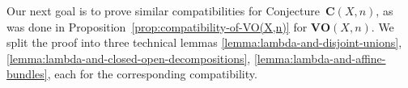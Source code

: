 \documentclass[10pt,a4paper,oneside,draft]{article}
\DeclareMathOperator{\Hom}{Hom}
\DeclareMathOperator{\ord}{ord}
\DeclareMathOperator{\rk}{rk}
\newcommand{\CC}{\mathbb{C}}
\newcommand{\RR}{\mathbb{R}}
\newcommand{\ZZ}{\mathbb{Z}}
\newcommand{\et}{\text{\it \'{e}t}}
\newcommand{\Wc}{\text{\it W,c}}
\newcommand{\dfn}{\mathrel{\mathop:}=}
\newcommand{\RHom}{R\!\Hom}
\theoremstyle{myplain}
\theoremstyle{mydefinition}
\newtheorem{remark}[theorem]{Remark}
\numberwithin{equation}{section}
\begin{document}


Our next goal is to prove similar compatibilities for
Conjecture~$\mathbf{C} (X,n)$, as was done in
Proposition~\ref{prop:compatibility-of-VO(X,n)} for $\mathbf{VO} (X,n)$.
We split the proof into three technical lemmas
\ref{lemma:lambda-and-disjoint-unions},
\ref{lemma:lambda-and-closed-open-decompositions},
\ref{lemma:lambda-and-affine-bundles}, each for the corresponding compatibility.
\end{document}
